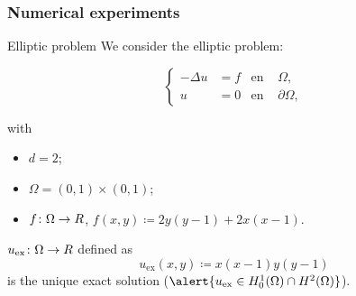 \subsubsection{Numerical experiments}
\begin{frame}{Elliptic problem}
	We consider the elliptic problem:
	\begin{block}{}
	\begin{equation*}
	\left\{
	\begin{aligned}
	-\Delta u&=f & \text{en } &\Omega, \\
	u&=0 & \text{en } &\partial\Omega,
	\end{aligned}
	\right.
	\end{equation*}
	\end{block}
	with
	\begin{itemize}
		\item $d=2$;
		\item $\Omega=(0,1)\times(0,1)$;
		\item $f\colon\Omega\to\relax R$, $f(x,y)\coloneqq2y(y-1) + 2x(x-1)$.
	\end{itemize}
	\vspace*{0.3cm}
	
	$u_{\text{ex}}\colon\Omega\to\relax R$ defined as
	\begin{equation*}
	\label{sol_experimento_eliptico}
	u_{\text{ex}}(x,y)\coloneqq x(x-1)y(y-1)
	\end{equation*}
	is the \alert{unique exact solution} ($\alert{u_{\text{ex}}\in H_0^1(\Omega)\cap H^2(\Omega)}$).
	\end{frame}


